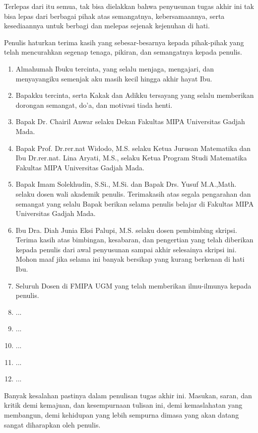 \documentclass[skripsi]{unhasskripsi}
\theoremstyle{definition}
\begin{document}
Terlepas dari itu semua, tak bisa dielakkan bahwa penyusunan tugas akhir ini tak bisa lepas dari berbagai pihak atas semangatnya, kebersamaannya, serta ke\-sediaannya untuk berbagi dan melepas sejenak kejenuhan di hati.

Penulis haturkan terima kasih yang sebesar-besarnya kepada pihak-pihak yang telah mencurahkan segenap tenaga, pikiran, dan semangatnya kepada penulis.

\begin{enumerate}
\item Almahumah Ibuku tercinta, yang selalu menjaga, mengajari, dan menyayangiku semenjak aku masih kecil hingga akhir hayat Ibu.
\item Bapakku tercinta, serta Kakak dan Adikku tersayang yang selalu memberikan dorongan semangat, do'a, dan motivasi tiada henti.
\item Bapak Dr. Chairil Anwar selaku Dekan Fakultas MIPA Universitas Gadjah Mada.
\item Bapak Prof. Dr.rer.nat Widodo, M.S. selaku Ketua Jurusan Matematika dan Ibu Dr.rer.nat. Lina Aryati, M.S., selaku Ketua Program Studi Matematika Fakultas MIPA Universitas Gadjah Mada.
\item Bapak Imam Solekhudin, S.Si., M.Si. dan Bapak Drs. Yusuf M.A.,Math. selaku dosen wali akademik penulis. Terimakasih atas segala pengarahan dan semangat yang selalu Bapak berikan selama penulis belajar di Fakultas MIPA Universitas Gadjah Mada.
\item Ibu Dra. Diah Junia Eksi Palupi, M.S. selaku dosen pembimbing skripsi. Terima kasih atas bimbingan, kesabaran, dan pengertian yang telah diberikan kepada penulis dari awal penyusunan sampai akhir selesainya skripsi ini. Mohon maaf jika selama ini banyak bersikap yang kurang berkenan di hati Ibu.
\item Seluruh Dosen di FMIPA UGM yang telah memberikan ilmu-ilmunya kepada penulis.
\item ...
\item ...
\item ...
\item ...
\item ...
\end{enumerate}

Banyak kesalahan pastinya dalam penulisan tugas akhir ini. Masukan, saran, dan kritik demi kemajuan, dan kesempurnaan tulisan ini, demi kemaslahatan yang membangun, demi kehidupan yang lebih sempurna dimasa yang akan datang sangat diharapkan oleh penulis.
\end{document}
